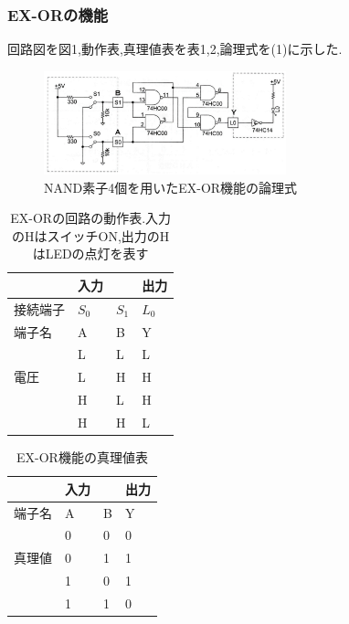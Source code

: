 \documentclass[twocolumn, 10pt,a4j]{jsarticle}
\begin{document}
  \subsubsection{EX-ORの機能}
    回路図を図1,動作表,真理値表を表1,2,論理式を(1)に示した.
    \begin{figure}[H]
      \begin{center}
        \includegraphics[width=7cm]{../img/ex_or/ex-or_kairo.png}
        \caption{NAND素子4個を用いたEX-OR機能の論理式}
      \end{center}
    \end{figure}
    \begin{table}[]
      \centering
      \caption{EX-ORの回路の動作表.入力のHはスイッチON,出力のHはLEDの点灯を表す}
      \label{my-label}
      \begin{tabular}{l|ll|l}
            & 入力                      &    & 出力 \\ \hline
        接続端子 & \multicolumn{1}{l|}{$S_{0}$} & $S_{1}$ & $L_{0}$ \\ \hline
        端子名  & \multicolumn{1}{l|}{A}  & B  & Y  \\ \hline
            & \multicolumn{1}{l|}{L}  & L  & L  \\
        電圧   & \multicolumn{1}{l|}{L}  & H  & H  \\
            & \multicolumn{1}{l|}{H}  & L  & H  \\
            & \multicolumn{1}{l|}{H}  & H  & L 
      \end{tabular}
    \end{table}
    \begin{table}[]
      \centering
      \caption{EX-OR機能の真理値表}
      \label{my-label}
      \begin{tabular}{l|ll|l}
            & 入力                     &   & 出力 \\ \hline
        端子名 & \multicolumn{1}{l|}{A} & B & Y  \\ \hline
            & \multicolumn{1}{l|}{0} & 0 & 0  \\
        真理値 & \multicolumn{1}{l|}{0} & 1 & 1  \\
            & \multicolumn{1}{l|}{1} & 0 & 1  \\
            & \multicolumn{1}{l|}{1} & 1 & 0 
      \end{tabular}
    \end{table}
    
\end{document}
